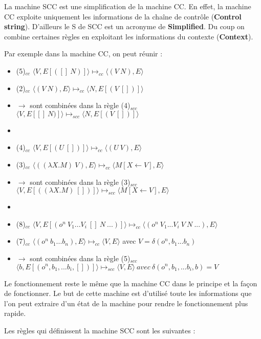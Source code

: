 \documentclass[10pt,a4paper]{report}
\begin{document}
La machine SCC est une simplification de la machine CC. En effet, la machine CC exploite uniquement les informations de la chaîne de contrôle (\textbf{Control string}). D'ailleurs le S de SCC est un acronyme de \textbf{Simplified}. Du coup on combine certaines règles en exploitant les informations du contexte (\textbf{Context}).
\bigbreak


Par exemple dans la machine CC, on peut réunir :

\begin{itemize}
\item[] (5)$_{cc}$ $\langle V,E[([]~N)]\rangle \longmapsto_{cc} \langle(V~N),E\rangle$
\item[] (2)$_{cc}$ $\langle(V~N),E\rangle \longmapsto_{cc}  \langle N,E[(V~[])]\rangle$
\item[] $\rightarrow$ sont combinées dans la règle (4)$_{scc}$ $ \langle V,E[[]~N)]\rangle \longmapsto_{scc} \langle N,E[(V~[])]\rangle$
\item[]
\item[] (4)$_{cc}$ $\langle V,E[(U~[])]\rangle \longmapsto_{cc} \langle(U~V),E\rangle$
\item[]	(3)$_{cc}$ $\langle((\lambda X.M)~V),E\rangle \longmapsto_{cc} \langle M[X\longleftarrow V],E\rangle$
\item[] $\rightarrow$ sont combinées dans la règle (3)$_{scc}$ $\langle V,E[((\lambda X.M)~[])]\rangle \longmapsto_{scc} \langle M[X\leftarrow V],E\rangle$
\item[]
\item[] (8)$_{cc}$ $\langle V,E[(o^{n}~V_{1}...V_{i}~[]~N~...)]\rangle \longmapsto_{cc} \langle(o^{n}~V_{1}...V_{i}~V~N ~...),E\rangle$ 
\item[] (7)$_{cc}$ $\langle(o^{n}~b_{1}...b_{n}),E\rangle \longmapsto_{cc}  \langle V,E\rangle$ avec $V = \delta(o^{n},b_{1}...b_{n})$ 
\item[] $\rightarrow$ sont combinées dans la règle (5)$_{scc}$ $\langle b,E[(o^{n},b_{1},...b_{i},[])]\rangle \longmapsto_{scc} \langle V,E\rangle~avec~\delta
  (o^{n},b_{1},...b_{i},b)=V$
\end{itemize}
\medbreak

Le fonctionnement reste le même que la machine CC dans le principe et la façon de fonctionner. Le but de cette machine est d'utilisé toute les informations que l'on peut extraire d'un état de la machine pour rendre le fonctionnement plus rapide.
\bigbreak


Les règles qui définissent la machine SCC sont les suivantes :
\end{document}
